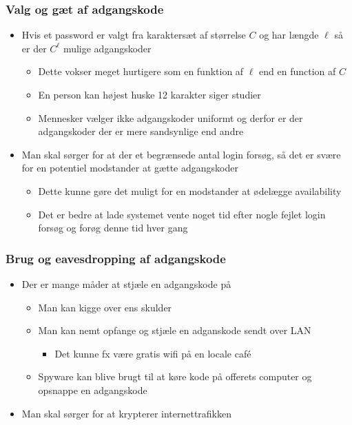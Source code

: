 \documentclass[a4, english]{article}
\begin{document}
\subsubsection{Valg og gæt af adgangskode}
\begin{itemize}
	\item Hvis et password er valgt fra karaktersæt af størrelse $C$ og har længde $\ell$ så er der $C^\ell$ mulige adgangskoder 
  \begin{itemize}
  	\item Dette vokser meget hurtigere som en funktion af $\ell$ end en function af $C$
    \item En person kan højest huske 12 karakter siger studier
    \item Mennesker vælger ikke adgangskoder uniformt og derfor er der adgangskoder der er mere sandsynlige end andre  
  \end{itemize} 
  \item Man skal sørger for at der et begrænsede antal login forsøg, så det er svære for en potentiel modstander at gætte adgangskoder
  \begin{itemize}
  	\item Dette kunne gøre det muligt for en modstander at ødelægge availability  
    \item Det er bedre at lade systemet vente noget tid efter nogle fejlet login forsøg og forøg denne tid hver gang 
  \end{itemize} 
\end{itemize}

\subsubsection{Brug og eavesdropping af adgangskode}
\begin{itemize}
	\item Der er mange måder at stjæle en adgangskode på
  \begin{itemize}
  	\item Man kan kigge over ens skulder
    \item Man kan nemt opfange og stjæle en adganskode sendt over LAN
    \begin{itemize}
    	\item Det kunne fx være gratis wifi på en locale café  
    \end{itemize}
    \item Spyware kan blive brugt til at køre kode på offerets computer og opsnappe en adgangskode  
  \end{itemize}
  \item Man skal sørger for at krypterer internettrafikken
\end{itemize}
\end{document}
